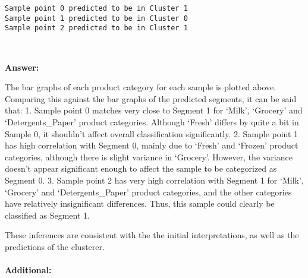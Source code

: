 \documentclass{article}
\begin{document}
    \begin{Verbatim}[commandchars=\\\{\}]
Sample point 0 predicted to be in Cluster 1
Sample point 1 predicted to be in Cluster 0
Sample point 2 predicted to be in Cluster 1
    \end{Verbatim}

    \begin{center}
    \end{center}
    { \hspace*{\fill} \\}
    
    \textbf{Answer:}

The bar graphs of each product category for each sample is plotted
above. Comparing this against the bar graphs of the predicted segments,
it can be said that: 1. Sample point 0 matches very close to Segment 1
for `Milk', `Grocery' and `Detergents\_Paper' product categories.
Although `Fresh' differs by quite a bit in Sample 0, it shouldn't affect
overall classification significantly. 2. Sample point 1 has high
correlation with Segment 0, mainly due to `Fresh' and `Frozen' product
categories, although there is slight variance in `Grocery'. However, the
variance doesn't appear significant enough to affect the sample to be
categorized as Segment 0. 3. Sample point 2 has very high correlation
with Segment 1 for `Milk', `Grocery' and `Detergents\_Paper' product
categories, and the other categories have relatively insignificant
differences. Thus, this sample could clearly be classified as Segment 1.

These inferences are consistent with the the initial interpretations, as
well as the predictions of the clusterer.

    \paragraph{Additional:}\label{additional}
\end{document}
